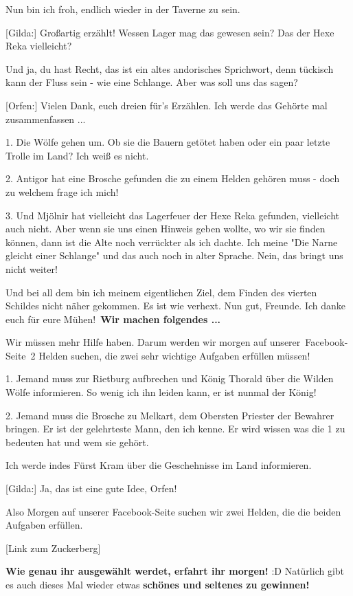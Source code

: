 \documentclass[10pt, a4paper, oneside]{book}
\newcommand{\bildmitts}[2][height=0.32\textwidth,width=0.48\textwidth,keepaspectratio]{%
    \begin{center}
        \texttt{[image: Chronik der Andorversen/Bilder/\#2]}
    \end{center}
}
\begin{document}
\begin{multicols}{2}
Nun bin ich froh, endlich wieder in der Taverne zu sein.

[Gilda:] Großartig erzählt! Wessen Lager mag das gewesen sein? Das der Hexe Reka vielleicht?

Und ja, du hast Recht, das ist ein altes andorisches Sprichwort, denn tückisch kann der Fluss sein - wie eine Schlange. Aber was soll uns das sagen?

[Orfen:] Vielen Dank, euch dreien für's Erzählen. Ich werde das Gehörte mal zusammenfassen ...

1. Die Wölfe gehen um. Ob sie die Bauern getötet haben oder ein paar letzte Trolle im Land? Ich weiß es nicht.

2. Antigor hat eine Brosche gefunden die zu einem Helden gehören muss - doch zu welchem frage ich mich!


3. Und Mjölnir hat vielleicht das Lagerfeuer der Hexe Reka gefunden, vielleicht auch nicht. Aber wenn sie uns einen Hinweis geben wollte, wo wir sie finden können, dann ist die Alte noch verrückter als ich dachte. Ich meine "Die Narne gleicht einer Schlange" und das auch noch in alter Sprache. Nein, das bringt uns nicht weiter!

Und bei all dem bin ich meinem eigentlichen Ziel, dem Finden des vierten Schildes nicht näher gekommen. Es ist wie verhext. Nun gut, Freunde. Ich danke euch für eure Mühen! \textbf{Wir machen folgendes ...}

Wir müssen mehr Hilfe haben. Darum werden wir morgen auf unserer Facebook-Seite 2 Helden suchen, die zwei sehr wichtige Aufgaben erfüllen müssen!

1. Jemand muss zur Rietburg aufbrechen und König Thorald über die Wilden Wölfe informieren. So wenig ich ihn leiden kann, er ist nunmal der König!

2. Jemand muss die Brosche zu Melkart, dem Obersten Priester der Bewahrer bringen. Er ist der gelehrteste Mann, den ich kenne. Er wird wissen was die 1 zu bedeuten hat und wem sie gehört.

Ich werde indes Fürst Kram über die Geschehnisse im Land informieren.

[Gilda:] Ja, das ist eine gute Idee, Orfen!

Also Morgen auf unserer Facebook-Seite suchen wir zwei Helden, die die beiden Aufgaben erfüllen.

[Link zum Zuckerberg]

\textbf{Wie genau ihr ausgewählt werdet, erfahrt ihr morgen!} :D
Natürlich gibt es auch dieses Mal wieder etwas \textbf{schönes und seltenes zu gewinnen!}


\end{multicols}
\end{document}

